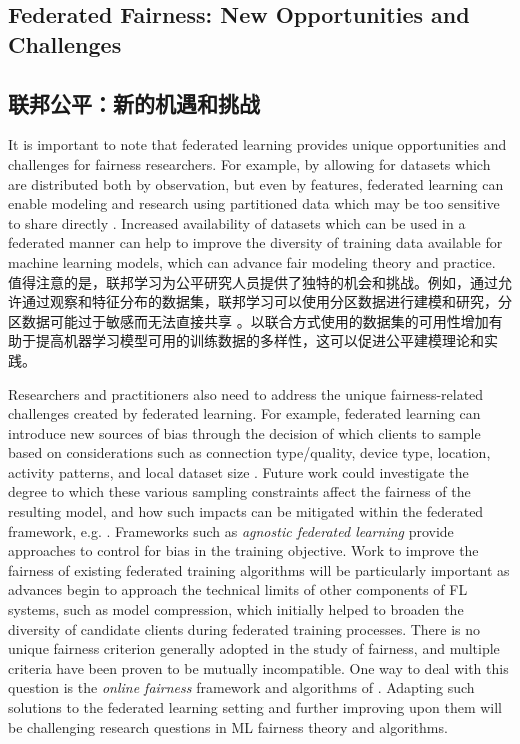 \subsection{Federated Fairness: New Opportunities and Challenges}\label{subsec:federated-fairness-new-challenges-opportunities}
\subsection*{联邦公平：新的机遇和挑战} 

It is important to note that federated learning provides unique opportunities and challenges for fairness researchers. For example, by allowing for datasets which are distributed both by observation, but even by features, federated learning can enable modeling and research using partitioned data which may be too sensitive to share directly \cite{gupta2018distributed, Hardy2017-da}. Increased availability of datasets which can be used in a federated manner can help to improve the diversity of training data available for machine learning models, which can advance fair modeling theory and practice.
值得注意的是，联邦学习为公平研究人员提供了独特的机会和挑战。例如，通过允许通过观察和特征分布的数据集，联邦学习可以使用分区数据进行建模和研究，分区数据可能过于敏感而无法直接共享 \cite{gupta2018distributed, Hardy2017-da}。以联合方式使用的数据集的可用性增加有助于提高机器学习模型可用的训练数据的多样性，这可以促进公平建模理论和实践。

Researchers and practitioners also need to address the unique fairness-related challenges created by federated learning. For example, federated learning can introduce new sources of bias through the decision of which clients to sample based on considerations such as connection type/quality, device type, location, activity patterns, and local dataset size \cite{bonawitz19sysml}. Future work could investigate the degree to which these various sampling constraints affect the fairness of the resulting model, and how such impacts can be mitigated within the federated framework, e.g. \cite{li2019fair,fair_quantile,moreau}. Frameworks such as \emph{agnostic federated learning} \cite{Mohri2019} provide approaches to control for bias in the training objective. Work to improve the fairness of existing federated training algorithms will be particularly important as advances begin to approach the technical limits of other components of FL systems, such as model compression, which initially helped to broaden the diversity of candidate clients during federated training processes. There is no unique fairness criterion generally adopted in  the study of fairness, and multiple criteria have been proven to be mutually incompatible. One way to deal with this question is the \emph{online fairness} framework and algorithms of \citet{AwasthiCortesMansourMohri2020}. Adapting such solutions to the federated learning setting and further improving upon them will be challenging research questions in ML fairness theory and algorithms.

